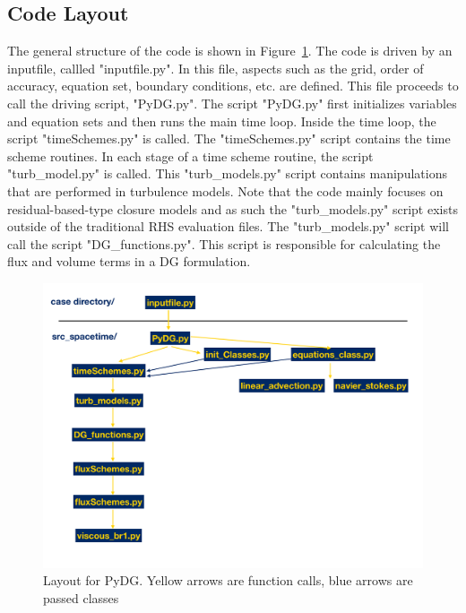\documentclass[times,12pt]{article}%
\begin{document}
\subsection{Code Layout}
The general structure of the code is shown in Figure~\ref{fig:layout}. The code is driven by an inputfile, callled "inputfile.py". In this file, aspects such as the grid, order of accuracy, equation set, boundary conditions, etc. are defined. This file proceeds to call the driving script, "PyDG.py". The script "PyDG.py" first initializes variables and equation sets and then runs the main time loop. Inside the time loop, the script "timeSchemes.py" is called. The "timeSchemes.py" script contains the time scheme routines. In each stage of a time scheme routine, the script "turb\_model.py" is called. This "turb\_models.py" script contains manipulations that are performed in turbulence models. Note that the code mainly focuses on residual-based-type closure models and as such the "turb\_models.py" script exists outside of the traditional RHS evaluation files. The "turb\_models.py" script will call the script "DG\_functions.py". This script is responsible for calculating the flux and volume terms in a DG formulation. 
\begin{figure}
\includegraphics[trim={0.05cm 0 1.75cm 1cm},clip,width=1.\linewidth]{figs/pydg_layout.pdf}
\caption{Layout for PyDG. Yellow arrows are function calls, blue arrows are passed classes}
\label{fig:layout}
\end{figure}
 
 
\end{document}
